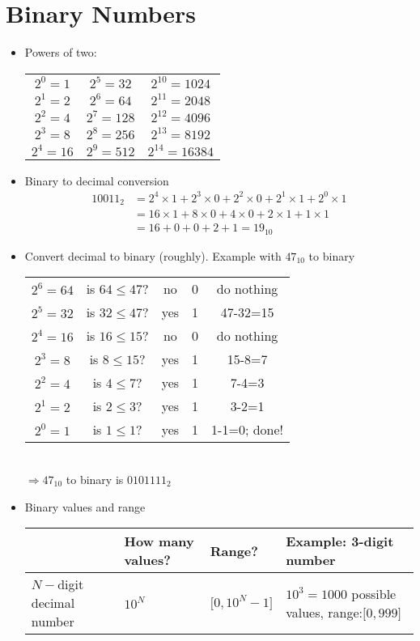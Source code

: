 \documentclass[a4paper]{article}
\begin{document}
\section{Binary Numbers}
\begin{itemize}
\item Powers of two:\\
\begin{tabular}{c|c|c}
$2^0= 1$ & $2^5=32$ & $2^{10}= 1024$\\ 
$2^1= 2$ & $2^6=64$ & $2^{11}= 2048$\\ 
$2^2= 4$ & $2^7=128$ & $2^{12}= 4096$\\ 
$2^3= 8$ & $2^8=256$ & $2^{13}= 8192$\\ 
$2^4= 16$ & $2^9=512$ & $2^{14}= 16384$\\ 
\end{tabular}
\item Binary to decimal conversion
\begin{align*}
10011_2&=2^4\times 1 +2^3\times 0 + 2^2\times 0 +2^1\times 1 +2^0\times 1\\
&=16 \times 1+8 \times 0+4 \times 0+2 \times 1+1 \times 1\\
&=16+0+0+2+1=19_{10}
\end{align*}
\item Convert decimal to binary (roughly). Example with $47_{10}$ to binary\\
\begin{tabular}{c|c|c|c|c}
$2^6=64$& is $64\leq 47$?&no&0&do nothing\\ 
$2^5=32$& is $32\leq 47$?&yes&1&47-32=15\\
$2^4=16$& is $16\leq 15$?&no&0&do nothing\\
$2^3=8$& is $8\leq 15$?&yes&1&15-8=7\\ 
$2^2=4$& is $4\leq 7$?&yes&1&7-4=3\\
$2^1=2$& is $2\leq 3$?&yes&1&3-2=1\\
$2^0=1$& is $1\leq 1$?&yes&1&1-1=0; done!\\
\end{tabular}\\
$\Rightarrow 47_{10}$ to binary is $0101111_2$ 
\item Binary values and range\\
\begin{tabularx}{15cm}{X|X|X|X|}
{}& How many values? & Range? & Example: 3-digit number\\\hline
$N-$digit decimal number & $10^N$ & $\lbrack 0,10^{N}-1\rbrack$ & $10^3=1000$ possible values, range:$\lbrack 0,999\rbrack$\\

\end{tabularx}
\end{itemize}
\end{document}
